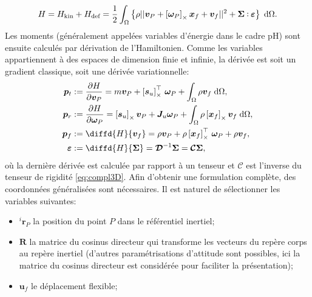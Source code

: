 \begin{equation*}
H = H_{\text{kin}} + H_{\text{def}}= \frac{1}{2} \int_{\Omega} \left\{\rho ||\bm{v}_P + \crmat{\bm{\omega}_P} \bm{x}_f + {\bm{v}}_f||^2 + \bm\Sigma \cddot \bm\varepsilon \right\}  \d{\Omega}.
\end{equation*}
Les moments (généralement appelées variables d'énergie dans le cadre pH) sont ensuite calculés par dérivation de l'Hamiltonien. Comme les variables appartiennent à des espaces de dimension finie et infinie, la dérivée est soit un gradient classique, soit une dérivée variationnelle:
\begin{equation*}
\begin{aligned}
\bm{p}_t &:= \diffp{H}{\bm{v}_P} = m \bm{v}_P + \crmat{\bm{s}_u}^\top \, \bm\omega_P + \int_{\Omega} \rho \bm{v}_f \d{\Omega}, \\
\bm{p}_r &:= \diffp{H}{\bm\omega_P} = \crmat{\bm{s}_u} \bm{v}_P + \bm{J}_u \bm\omega_P + \int_{\Omega} \rho \crmat{\bm{x}_f} \bm{v}_f \d{\Omega}, \\
\bm{p}_f &:= \diffd{H}{\bm{v}_f} = \rho \bm{v}_P + \rho \crmat{\bm{x}_f}^\top \, \bm\omega_P + \rho \bm{v}_f, \\
\bm\varepsilon &:= \diffd{H}{\bm\Sigma} = \bm{\mathcal{D}}^{-1} \bm\Sigma= \bm{\mathcal{C}} \bm\Sigma,
\end{aligned}
\end{equation*}
où la dernière dérivée est calculée par rapport à un tenseur et $\bm{\mathcal{C}} $ est l'inverse du tenseur de rigidité \eqref{eq:compl3D}. Afin d'obtenir une formulation complète, des coordonnées généralisées sont nécessaires. Il est naturel de sélectionner les variables suivantes:
\begin{itemize}
\item $^i \bm{r}_P$ la position du point $P$ dans le référentiel inertiel;
\item $\bm{R}$ la matrice du cosinus directeur qui transforme les vecteurs du repère corps au repère inertiel (d'autres paramétrisations d'attitude sont possibles, ici la matrice du cosinus directeur est considérée pour faciliter la présentation);
\item $\bm{u}_f$ le déplacement flexible;
\end{itemize}


